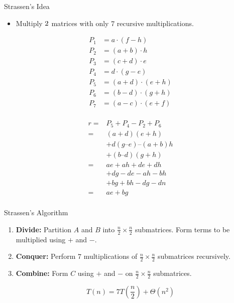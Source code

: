 \documentclass{beamer}
\begin{document}
\begin{frame}{Strassen's Idea}
    \begin{itemize}
        \item Multiply $2 \time 2$ matrices with only 7 recursive multiplications.
    \end{itemize}
    \begin{minipage}{0.48\textwidth}
        \begin{equation*}
            \begin{split}
                P_1 &= a \cdot (f - h) \\
                P_2 &= (a + b) \cdot h \\
                P_3 &= (c + d) \cdot e \\
                P_4 &= d \cdot (g - e) \\
                P_5 &= (a + d) \cdot (e + h) \\
                P_6 &= (b - d) \cdot (g + h) \\
                P_7 &= (a - c) \cdot (e + f) \\
            \end{split}
        \end{equation*}
    \end{minipage} %
    \hfill
    \begin{minipage}{0.48\textwidth}
        \begin{equation*}
            \begin{split}
                r =& P_5 + P_4 - P_2 + P_6 \\
                  =& (a + d)(e + h) \\
                   & + d(g – e) – (a + b) h \\
                   & + (b – d)(g + h) \\
                  =& ae + ah + de + dh \\
                   & + dg - de - ah - bh \\
                   & +bg + bh - dg-dn \\
                  =& ae + bg \\
            \end{split}
        \end{equation*}
    \end{minipage}
\end{frame}

\begin{frame}{Strassen's Algorithm}
    \begin{enumerate}
        \item \textbf{\Large Divide:} Partition $A$ and $B$ into $\frac{n}{2} \times \frac{n}{2}$ submatrices.  Form terms to be multiplied using $+$ and $-$.
        \item \textbf{\Large Conquer:} Perform $7$ multiplications of $\frac{n}{2} \times \frac{n}{2}$ submatrices recursively.
        \item \textbf{\Large Combine:} Form $C$ using $+$ and $-$ on $\frac{n}{2} \times \frac{n}{2}$ submatrices.
    \end{enumerate} \pause
    $$
        T(n) = 7T\left(\frac{n}{2}\right) + \Theta(n^2)
    $$
\end{frame}
\end{document}
